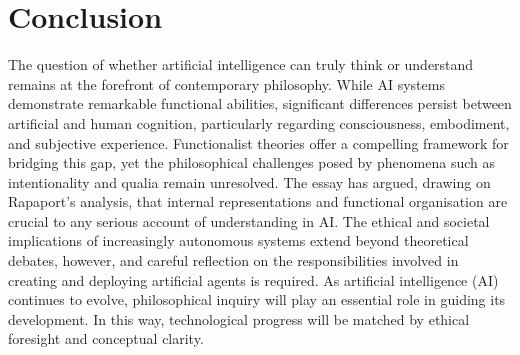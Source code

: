 \documentclass[runningheads]{llncs}
\begin{document}
\section{Conclusion}
The question of whether artificial intelligence can truly think or understand remains at the forefront of contemporary philosophy. While AI systems demonstrate remarkable functional abilities, significant differences persist between artificial and human cognition, particularly regarding consciousness, embodiment, and subjective experience. Functionalist theories offer a compelling framework for bridging this gap, yet the philosophical challenges posed by phenomena such as intentionality and qualia remain unresolved.
The essay has argued, drawing on Rapaport's analysis, that internal representations and functional organisation are crucial to any serious account of understanding in AI. The ethical and societal implications of increasingly autonomous systems extend beyond theoretical debates, however, and careful reflection on the responsibilities involved in creating and deploying artificial agents is required. As artificial intelligence (AI) continues to evolve, philosophical inquiry will play an essential role in guiding its development. In this way, technological progress will be matched by ethical foresight and conceptual clarity.
%
%

\end{document}
